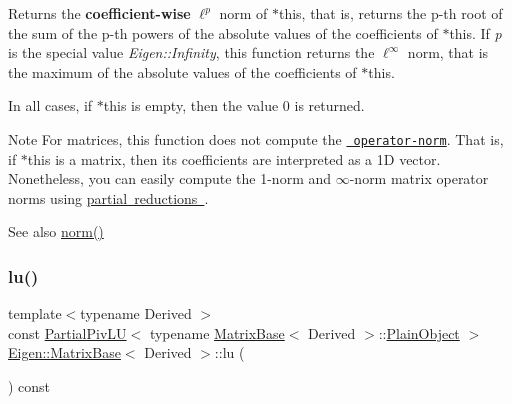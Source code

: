 \begin{DoxyReturn}{Returns}
the {\bfseries{coefficient-\/wise}} $ \ell^p $ norm of {\ttfamily $\ast$this}, that is, returns the p-\/th root of the sum of the p-\/th powers of the absolute values of the coefficients of {\ttfamily $\ast$this}. If {\itshape p} is the special value {\itshape Eigen\+::\+Infinity}, this function returns the $ \ell^\infty $ norm, that is the maximum of the absolute values of the coefficients of {\ttfamily $\ast$this}.
\end{DoxyReturn}
In all cases, if {\ttfamily $\ast$this} is empty, then the value 0 is returned.

\begin{DoxyNote}{Note}
For matrices, this function does not compute the \href{https://en.wikipedia.org/wiki/Operator_norm}{\texttt{ operator-\/norm}}. That is, if {\ttfamily $\ast$this} is a matrix, then its coefficients are interpreted as a 1D vector. Nonetheless, you can easily compute the 1-\/norm and $\infty$-\/norm matrix operator norms using \mbox{\hyperlink{}{partial reductions }}.
\end{DoxyNote}
\begin{DoxySeeAlso}{See also}
\mbox{\hyperlink{class_eigen_1_1_matrix_base_a5f6a3bc46add1f2e879ce15040e6987e}{norm()}} 
\end{DoxySeeAlso}
\mbox{\label{class_eigen_1_1_matrix_base_afb312afbfe960cbda67811552d876fae}} 
\subsubsection{\texorpdfstring{lu()}{lu()}}
{\footnotesize\ttfamily template$<$typename Derived $>$ \\
const \mbox{\hyperlink{class_eigen_1_1_partial_piv_l_u}{Partial\+Piv\+LU}}$<$ typename \mbox{\hyperlink{class_eigen_1_1_matrix_base}{Matrix\+Base}}$<$ Derived $>$\+::\mbox{\hyperlink{class_eigen_1_1_dense_base_aae45af9b5aca5a9caae98fd201f47cc4}{Plain\+Object}} $>$ \mbox{\hyperlink{class_eigen_1_1_matrix_base}{Eigen\+::\+Matrix\+Base}}$<$ Derived $>$\+::lu (\begin{DoxyParamCaption}{ }\end{DoxyParamCaption}) const\hspace{0.3cm}{\ttfamily [inline]}}

